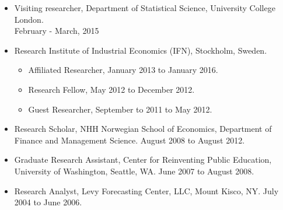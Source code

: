 \documentclass[margin]{res}
\begin{document}
\begin{resume}
\begin{itemize}
                  \item[] Visiting researcher, Department of Statistical Science, University College London. \\ February - March, 2015

                  \item[] Research Institute of Industrial Economics (IFN), Stockholm, Sweden.
                    \begin{itemize}
                    \item[] Affiliated Researcher, January 2013 to January 2016.
                    \item[] Research Fellow, May 2012 to December 2012.
                    \item[] Guest Researcher, September to 2011 to May 2012.
                    \end{itemize}
                  \item[] Research Scholar, NHH Norwegian School of Economics, Department of Finance and Management Science. August 2008 to August 2012.

                  \item[] Graduate Research Assistant, Center for Reinventing Public Education, University of Washington, Seattle, WA. June 2007 to August 2008.

                  \item[] Research Analyst, Levy Forecasting Center, LLC, Mount Kisco, NY. July 2004 to June 2006.

                  \end{itemize}


\end{resume}
\end{document}
